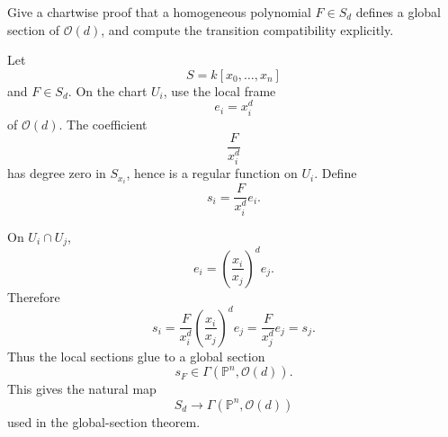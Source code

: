 \begin{problem}\label{prob:vi36-07}
Give a chartwise proof that a homogeneous polynomial \(F\in S_d\) defines a global section of \(\mathcal O(d)\), and compute the transition compatibility explicitly.
\end{problem}

\ifdefined\FullProblemDossiers
\begin{solution}
Let
\[
S=k[x_0,\ldots,x_n]
\]
and \(F\in S_d\). On the chart \(U_i\), use the local frame
\[
e_i=x_i^d
\]
of \(\mathcal O(d)\). The coefficient
\[
\frac{F}{x_i^d}
\]
has degree zero in \(S_{x_i}\), hence is a regular function on \(U_i\). Define
\[
s_i=\frac{F}{x_i^d}e_i.
\]

On \(U_i\cap U_j\),
\[
e_i
=
\left(\frac{x_i}{x_j}\right)^d e_j.
\]
Therefore
\[
s_i
=
\frac{F}{x_i^d}
\left(\frac{x_i}{x_j}\right)^d e_j
=
\frac{F}{x_j^d}e_j
=
s_j.
\]
Thus the local sections glue to a global section
\[
s_F\in\Gamma(\mathbb P^n,\mathcal O(d)).
\]
This gives the natural map
\[
S_d\longrightarrow\Gamma(\mathbb P^n,\mathcal O(d))
\]
used in the global-section theorem.
\end{solution}
\fi
